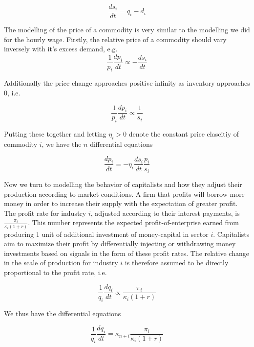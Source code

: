 \documentclass{article}
\theoremstyle{definition}
\begin{document}
\begin{equation}
    \frac{ds_i}{dt} = q_i - d_i \label{ds-by-dt}
\end{equation}

The modelling of the price of a commodity is very similar to the modelling we did for the hourly wage. Firstly, the relative price of a commodity should vary inversely with it's excess demand, e.g. 
\begin{equation}
    \frac{1}{p_i}\frac{dp_i}{dt} \propto -\frac{ds_i}{dt}
\end{equation}

Additionally the price change approaches positive infinity as inventory approaches $0$, i.e. 

\begin{equation}
    \frac{1}{p_i}\frac{dp_i}{dt} \propto \frac{1}{s_i}
\end{equation}

Putting these together and letting $\eta_i > 0$ denote the constant price elascitiy of commodity $i$, we have the $n$ differential equations

\begin{equation}\label{price-adjustment}
    \frac{dp_i}{dt} = -\eta_i\frac{ds_i}{dt}\frac{p_i}{s_i}
\end{equation}

Now we turn to modelling the behavior of capitalists and how they adjust their production according to market conditions. A firm that profits will borrow more money in order to increase their supply with the expectation of greater profit. The profit rate for industry $i$, adjusted according to their interest payments, is $\frac{\pi_i}{\kappa_i(1+r)}$. This number represents the expected profit-of-enterprise earned from producing $1$ unit of additional investment of money-capital in sector $i$. Capitalists aim to maximize their profit by differentially injecting or withdrawing money investments based on signals in the form of these profit rates. The relative change in the scale of production for industry $i$ is therefore assumed to be directly proportional to the profit rate, i.e. 

\begin{equation}
    \frac{1}{q_i}\frac{dq_i}{dt} \propto \frac{\pi_i}{\kappa_i(1+r)}
\end{equation}

We thus have the differential equations 

\begin{equation}
    \frac{1}{q_i}\frac{dq_i}{dt} = \kappa_{n+i}\frac{\pi_i}{\kappa_i(1+r)}
\end{equation}
\end{document}
